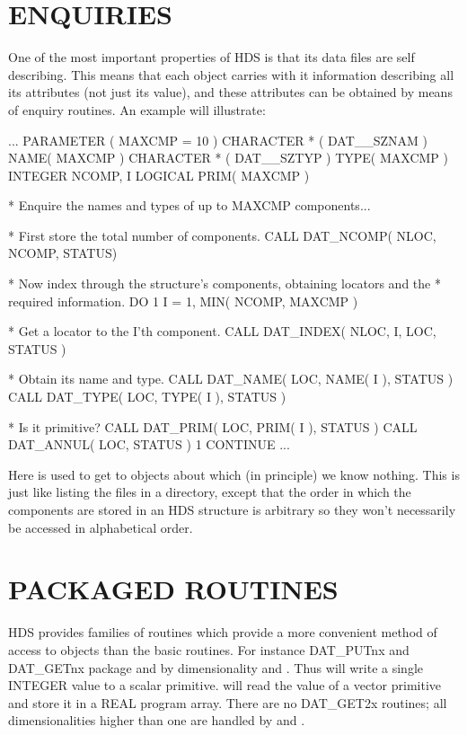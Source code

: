 \documentclass[twoside,11pt]{starlink}
\begin{document}
\section{ENQUIRIES}

One of the most important properties of HDS is that its data files are
self describing. This means that each object carries with it
information describing all its attributes (not just its value), and
these attributes can be obtained by means of enquiry routines. An
example will illustrate:

\begin{small}
\begin{terminalv}
      ...
      PARAMETER ( MAXCMP = 10 )
      CHARACTER * ( DAT__SZNAM ) NAME( MAXCMP )
      CHARACTER * ( DAT__SZTYP ) TYPE( MAXCMP )
      INTEGER NCOMP, I
      LOGICAL PRIM( MAXCMP )

*  Enquire the names and types of up to MAXCMP components...

*  First store the total number of components.
      CALL DAT_NCOMP( NLOC, NCOMP, STATUS)

*  Now index through the structure's components, obtaining locators and the
*  required information.
      DO 1 I = 1, MIN( NCOMP, MAXCMP )

*  Get a locator to the I'th component.
         CALL DAT_INDEX( NLOC, I, LOC, STATUS )

* Obtain its name and type.
         CALL DAT_NAME( LOC, NAME( I ), STATUS )
         CALL DAT_TYPE( LOC, TYPE( I ), STATUS )

* Is it primitive?
         CALL DAT_PRIM( LOC, PRIM( I ), STATUS )
         CALL DAT_ANNUL( LOC, STATUS )
 1    CONTINUE
      ...
\end{terminalv}
\end{small}

Here  is used to get  to
objects about which (in principle) we know nothing. This is just like
listing the files in a directory, except that the order in which the
components are stored in an HDS structure is arbitrary so they won't
necessarily be accessed in alphabetical order.

\section{PACKAGED ROUTINES}

HDS provides families of routines which provide a more convenient
method of access to objects than the basic routines. For instance
DAT\_PUTnx and DAT\_GETnx package  and
 by dimensionality and
. Thus  will
write a single INTEGER value to a scalar
primitive.  will read the value of a
vector primitive and store it in a REAL program array. There are no
DAT\_GET2x routines; all dimensionalities higher than one are handled
by  and
.
\end{document}
